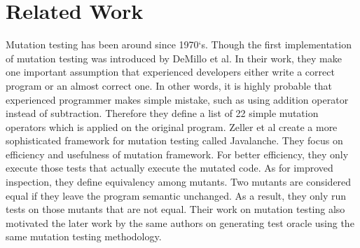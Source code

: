 \section{Related Work}
Mutation testing has been around since 1970`s. Though the first implementation of mutation testing was introduced by DeMillo et al\cite{demilo}. In their work, they make one important assumption that experienced developers either write a correct program or an almost correct one. In other words, it is highly probable that experienced programmer makes simple mistake, such as using addition operator instead of subtraction. Therefore they define a list of 22 simple mutation operators which is applied on the original program. 
Zeller et al\cite{zeller} create a more sophisticated framework for mutation testing called Javalanche. They focus on efficiency and usefulness of mutation framework. For better efficiency, they only execute those tests that actually execute the mutated code. As for improved inspection, they define equivalency among mutants. Two mutants are considered equal if they leave the program semantic unchanged. As a result, they only run tests on those mutants that are not equal. Their work on mutation testing also motivated the later work \cite{zeller2} by the same authors on generating test oracle using the same mutation testing methodology. 